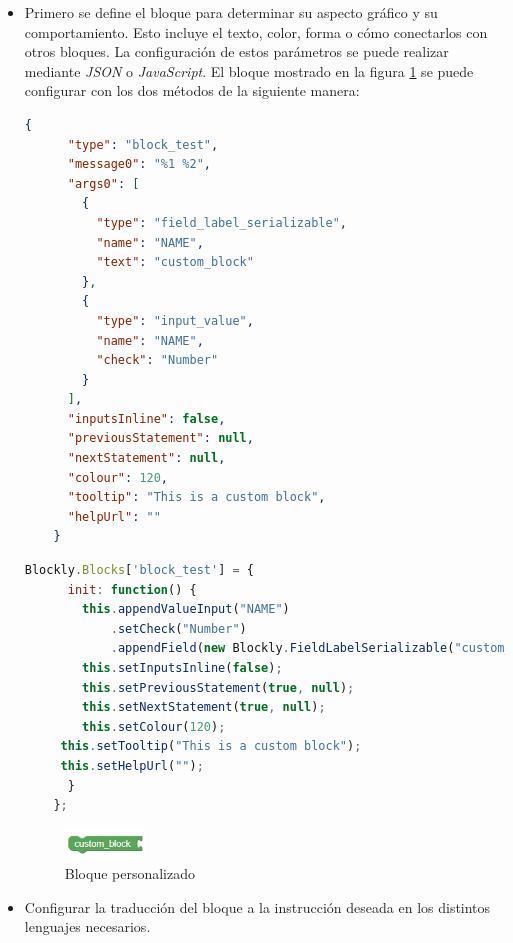 \begin{itemize}
    \item Primero se define el bloque para determinar su aspecto gráfico y su comportamiento. Esto incluye el texto, color, forma o cómo conectarlos con otros bloques. La configuración de estos parámetros se puede realizar mediante \textit{JSON} o \textit{JavaScript}. El bloque mostrado en la figura \ref{fig:customblock} se puede configurar con los dos métodos de la siguiente manera:
    
     \begin{lstlisting}[language=json, caption=Código en JSON para configurar un bloque personalizado]
     {
      "type": "block_test",
      "message0": "%1 %2",
      "args0": [
        {
          "type": "field_label_serializable",
          "name": "NAME",
          "text": "custom_block"
        },
        {
          "type": "input_value",
          "name": "NAME",
          "check": "Number"
        }
      ],
      "inputsInline": false,
      "previousStatement": null,
      "nextStatement": null,
      "colour": 120,
      "tooltip": "This is a custom block",
      "helpUrl": ""
    }
    \end{lstlisting}

    \begin{lstlisting}[language=javascript, caption=Código en javascript para configurar un bloque personalizado]
    Blockly.Blocks['block_test'] = {
      init: function() {
        this.appendValueInput("NAME")
            .setCheck("Number")
            .appendField(new Blockly.FieldLabelSerializable("custom_block"), "NAME");
        this.setInputsInline(false);
        this.setPreviousStatement(true, null);
        this.setNextStatement(true, null);
        this.setColour(120);
     this.setTooltip("This is a custom block");
     this.setHelpUrl("");
      }
    };
    \end{lstlisting}

    \begin{figure}[H]
    \centering
    \includegraphics[width=0.2\textwidth]{img/CustomBlock.png}
    \caption{Bloque personalizado} \label{fig:customblock}
    \end{figure}

    \item Configurar la traducción del bloque a la instrucción deseada en los distintos lenguajes necesarios.
    

\end{itemize}
